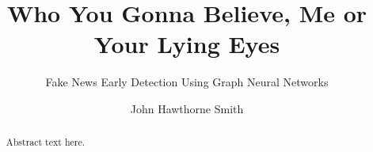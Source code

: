 \documentclass[NETN,manuscript]{stjour-new}
\begin{document}
\title[Who You Gonna Believe?]{Who You Gonna Believe, Me or Your Lying Eyes}
\subtitle{Fake News Early Detection Using Graph Neural Networks}



\author[John Hawthorne Smith]
{John Hawthorne Smith}








\begin{abstract}
Abstract text here.
\end{abstract}
\end{document}
